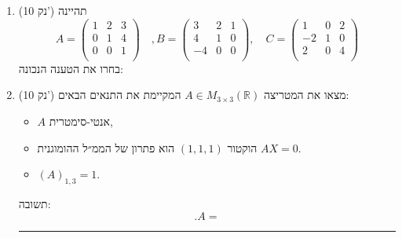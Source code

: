 \documentclass[12pt, a4paper]{article}
\newcommand{\rr}{\mathbb{R}}
\newcommand{\points}[1]{(#1 נק') }
\begin{document}
\begin{enumerate}
\noindent\rule{\textwidth-30pt}{0.4pt}




\item\points{10}
תהיינה
$$A=\begin{pmatrix}
1&2&3\\
0&1&4\\
0&0&1\\
\end{pmatrix}\quad,
B=
\begin{pmatrix}
3&2&1\\
4&1&0\\
-4&0&0\\
\end{pmatrix},\quad
C=
\begin{pmatrix}
1&0&2\\
-2&1&0\\
2&0&4\\
\end{pmatrix}$$
בחרו את הטענה הנכונה:
\begin{enumerate}
\end{enumerate}

\iffalse
\newpage

\item\points{10}
מצאו את המטריצה
$A\in M_{3\times 3}(\rr)$
המקיימת את התנאים הבאים:
\begin{itemize}
\item
$A$
אנטי-סימטרית,
\item
הוקטור
$(1,1,1)$
הוא פתרון של הממ״ל ההומוגנית
$AX=0$.

\item
$(A)_{1,3}=1$.
\end{itemize}

תשובה: 
$$.A=$$

\noindent\rule{\textwidth-30pt}{0.4pt}


\end{enumerate}
\end{document}
